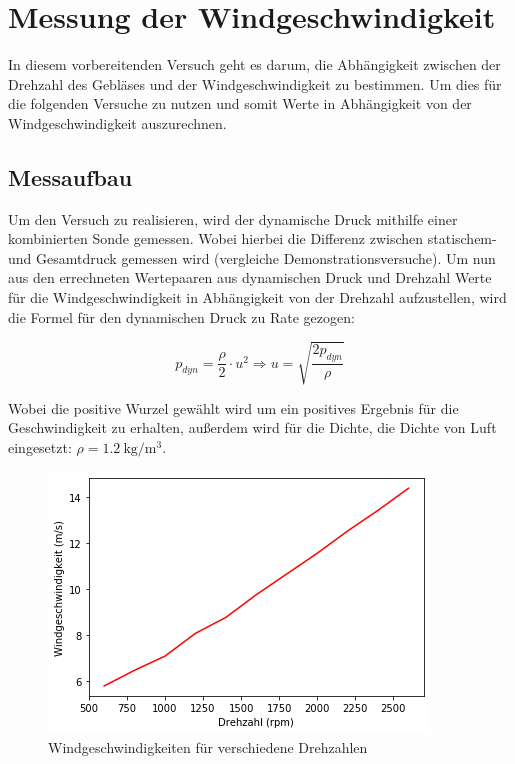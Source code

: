 \section{Messung der Windgeschwindigkeit}

In diesem vorbereitenden Versuch geht es darum, die Abhängigkeit zwischen der Drehzahl des Gebläses und der Windgeschwindigkeit zu bestimmen. Um dies für die folgenden Versuche zu nutzen und somit Werte in Abhängigkeit von der Windgeschwindigkeit auszurechnen.

\subsection{Messaufbau}

Um den Versuch zu realisieren, wird der dynamische Druck mithilfe einer kombinierten Sonde gemessen. Wobei hierbei die Differenz zwischen statischem- und Gesamtdruck gemessen wird (vergleiche Demonstrationsversuche). Um nun aus den errechneten Wertepaaren aus dynamischen Druck und Drehzahl Werte für die Windgeschwindigkeit in Abhängigkeit von der Drehzahl aufzustellen, wird die Formel für den dynamischen Druck zu Rate gezogen: 

\begin{equation}
    p_{dyn} = \frac{\rho}{2} \cdot u^2
    \Rightarrow u = \sqrt{\frac{2p_{dyn}}{\rho}}
\end{equation}

Wobei die positive Wurzel gewählt wird um ein positives Ergebnis für die Geschwindigkeit zu erhalten, außerdem wird für die Dichte, die Dichte von Luft eingesetzt: $\rho = \SI{1.2}{\kg\per\cubic\m}$.

\begin{figure}[h!]
    \centering
    \includegraphics[scale=0.8]{Aeromechanik/Protokoll/fig/Aeromechanik Versuch 1.2.png}
    \caption{Windgeschwindigkeiten für verschiedene Drehzahlen}
    \label{fig:Aeromechanik Versuch 1.2}
\end{figure}
